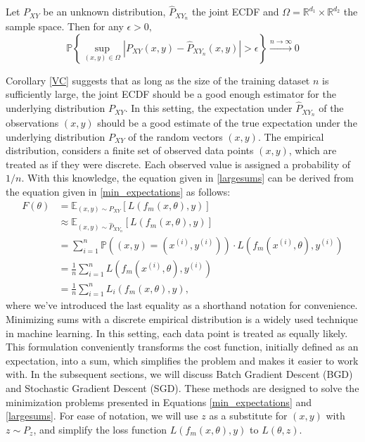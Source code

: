 \begin{corollary}\label{VC}
Let $P_{XY}$ be an unknown distribution, $\hat{P}_{XY_{n}}$ the joint ECDF and $\Omega=\mathbb{R}^{d_{1}}\times \mathbb{R}^{d_{2}}$ the sample space. Then for any $\epsilon>0,$
\begin{equation*}\tag{5.2.5}
\mathbb{P}\left\{\underset{(x,y)\in\Omega}{\sup}\left|P_{XY}(x,y)-\hat{P}_{XY_{n}}(x,y)\right| > \epsilon\right\} \xrightarrow{n\rightarrow\infty} 0
\end{equation*}
\end{corollary}
Corollary \ref{VC} suggests that as long as the size of the training dataset $n$ is sufficiently large, the joint ECDF should be a good enough estimator for the underlying distribution $P_{XY}.$ In this setting, the expectation under $\hat{P}_{XY_{n}}$ of the observations $(x,y)$ should be a good estimate of the true expectation under the underlying distribution $P_{XY}$ of the random vectors $(x,y).$ The empirical distribution, considers a finite set of observed data points $(x,y)$, which are treated as if they were discrete. Each observed value is assigned a probability of $1/n.$ With this knowledge, the equation given in \eqref{largesums} can be derived from the equation given in \eqref{min_expectations} as follows:
\begin{equation*}\tag{5.2.6}
\begin{aligned}
F(\theta)
    &= \mathbb{E}_{(x,y)\sim P_{XY}}[L(f_{m}(x, \theta), y)] \\
    &\approx \mathbb{E}_{(x,y)\sim \hat{P}_{XY_{n}}}[L(f_{m}(x, \theta), y)]\\ 
    &= \sum_{i=1}^{n}\mathbb{P}((x, y) = (x^{(i)}, y^{(i)}))\cdot L(f_{m}(x^{(i)}, \theta), y^{(i)})\\ 
    &= \frac{1}{n}\sum_{i=1}^{n}L(f_{m}(x^{(i)}, \theta), y^{(i)})\\
    &= \frac{1}{n}\sum_{i=1}^{n}L_{i}(f_{m}(x, \theta), y),
\end{aligned}
\end{equation*}
where we've introduced the last equality as a shorthand notation for convenience. 
Minimizing sums with a discrete empirical distribution is a widely used technique in machine learning. In this setting, each data point is treated as equally likely. This formulation conveniently transforms the cost function, initially defined as an expectation, into a sum, which simplifies the problem and makes it easier to work with. In the subsequent sections, we will discuss Batch Gradient Descent (BGD) and Stochastic Gradient Descent (SGD). These methods are designed to solve the minimization problems presented in Equations \eqref{min_expectations} and \eqref{largesums}. For ease of notation, we will use $z$ as a substitute for $(x,y)$ with $z\sim P_z$, and simplify the loss function $L(f_{m}(x, \theta), y)$ to $L(\theta, z)$.
